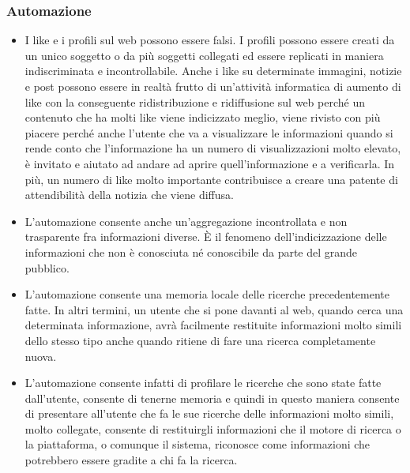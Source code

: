 \subsubsection{Automazione}
\begin{itemize}
    \item I like e i profili sul web possono essere falsi. I profili possono essere creati da un unico soggetto o da più soggetti collegati ed essere replicati in maniera indiscriminata e incontrollabile. Anche i like su determinate immagini, notizie e post possono essere in realtà frutto di un'attività informatica di aumento di like con la conseguente ridistribuzione e ridiffusione sul web perché un contenuto che ha molti like viene indicizzato meglio, viene rivisto con più piacere perché anche l'utente che va a visualizzare le informazioni quando si rende conto che l'informazione ha un numero di visualizzazioni molto elevato, è invitato e aiutato ad andare ad aprire quell'informazione e a verificarla. In più, un numero di like molto importante contribuisce a creare una patente di attendibilità della notizia che viene diffusa.
    \item L'automazione consente anche un'aggregazione incontrollata e non trasparente fra informazioni diverse. È il fenomeno dell'indicizzazione delle informazioni che non è conosciuta né conoscibile da parte del grande pubblico.
    \item L'automazione consente una memoria locale delle ricerche precedentemente fatte. In altri termini, un utente che si pone davanti al web, quando cerca una determinata informazione, avrà facilmente restituite informazioni molto simili dello stesso tipo anche quando ritiene di fare una ricerca completamente nuova.
    \item L'automazione consente infatti di profilare le ricerche che sono state fatte dall'utente, consente di tenerne memoria e quindi in questo maniera consente di presentare all'utente che fa le sue ricerche delle informazioni molto simili, molto collegate, consente di restituirgli informazioni che il motore di ricerca o la piattaforma, o comunque il sistema, riconosce come informazioni che potrebbero essere gradite a chi fa la ricerca.



\end{itemize}

